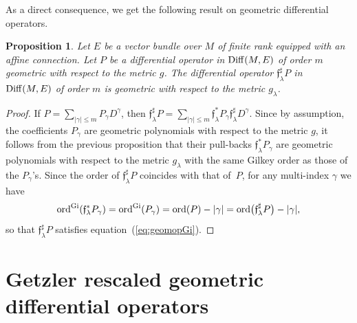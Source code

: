 \documentclass[10pt,a4paper]{amsart}
\numberwithin{equation}{section}
\newtheorem{prop}[thm]{Proposition}
\theoremstyle{definition}
\begin{document}
As a direct consequence, we get the following result on geometric differential operators.
\begin{prop} \label{pro:geometricopes} Let $E$ be a vector bundle over $M$ of finite rank equipped with an affine connection. Let $P$ be a differential operator in $ {\rm Diff}(M, E)$ of order $m$ geometric with respect to the metric $g$. The differential operator $\mathfrak{f}_\lambda^\sharp P$ in $ {\rm Diff}(M, E)$ of order $m$ is geometric with respect to the metric $g_\lambda$.
\end{prop}
\begin{proof} { If $P= \sum_{\vert \gamma\vert \leq m} P_\gamma D^\gamma$, then $\mathfrak{f}_\lambda^\sharp P= \sum_{\vert \gamma\vert \leq m} \mathfrak{f}_\lambda^* P_\gamma \mathfrak{f}_\lambda^\sharp D^\gamma$.
Since by assumption, the coefficients $ P_\gamma$ are geometric polynomials with respect to the metric $g$, it follows from the previous proposition that their pull-backs $\mathfrak{f}_\lambda^* P_\gamma $ are geometric polynomials with respect to the metric $g_\lambda$ with the same Gilkey order as those of the $P_\gamma$'s. Since the order of $\mathfrak{f}_\lambda^\sharp P$ coincides with that of~$P$, for any multi-index $\gamma$ we have
\[ {\rm ord}^{\rm Gi}(\mathfrak{f}_\lambda^* P_{\gamma})= {\rm ord}^{\rm Gi}(P_{\gamma})={\rm ord}(P)- |\gamma|={\rm ord}\bigl(\mathfrak{f}_\lambda^\sharp P\bigr)- |\gamma|,\]
so that $\mathfrak{f}_\lambda^\sharp P$ satisfies equation~(\ref{eq:geomopGi}).}
\end{proof}
 	
\section{Getzler rescaled geometric differential operators}
\end{document}
